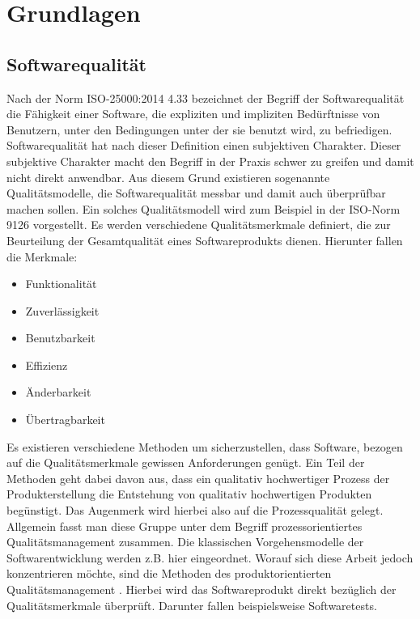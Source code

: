 \chapter{Grundlagen}
\label{sec:grundlagen}


\section{Softwarequalität}
\label{sec:softwarequalität}

Nach der Norm ISO-25000:2014 4.33 bezeichnet der Begriff der Softwarequalität die Fähigkeit einer Software, die expliziten und impliziten Bedürftnisse von Benutzern, unter den Bedingungen unter der sie benutzt wird, zu befriedigen.  \cite {international_organization_for_standardization_iso_so/iec_2014}
Softwarequalität hat nach dieser Definition einen subjektiven Charakter.
Dieser subjektive Charakter macht den Begriff in der Praxis schwer zu greifen und damit nicht direkt anwendbar. Aus diesem Grund existieren sogenannte Qualitätsmodelle, die Softwarequalität messbar und damit auch überprüfbar machen sollen.
Ein solches Qualitätsmodell wird zum Beispiel in der ISO-Norm 9126 vorgestellt. \cite{iso/iec_iso/iec_2001}
Es werden verschiedene Qualitätsmerkmale definiert, die zur Beurteilung der Gesamtqualität eines Softwareprodukts dienen.
Hierunter fallen die Merkmale:

\begin{itemize}
	  \itemsep0pt
      \item Funktionalität
      \item Zuverlässigkeit
      \item Benutzbarkeit
      \item Effizienz
      \item Änderbarkeit
      \item Übertragbarkeit          
\end{itemize}

Es existieren verschiedene Methoden um sicherzustellen, dass Software, bezogen auf die Qualitätsmerkmale gewissen Anforderungen genügt.
Ein Teil der Methoden geht dabei davon aus, dass ein qualitativ hochwertiger Prozess der Produkterstellung die Entstehung von qualitativ hochwertigen Produkten begünstigt.
Das Augenmerk wird hierbei also auf die Prozessqualität gelegt.
Allgemein fasst man diese Gruppe unter dem Begriff prozessorientiertes Qualitätsmanagement zusammen. Die klassischen Vorgehensmodelle der Softwarentwicklung werden z.B. hier eingeordnet.
Worauf sich diese Arbeit jedoch konzentrieren möchte, sind die Methoden des produktorientierten Qualitätsmanagement \cite{prof._dr._r._lindermeier_projekt-_2006}.
Hierbei wird das Softwareprodukt direkt bezüglich der Qualitätsmerkmale überprüft.
Darunter fallen beispielsweise Softwaretests.


